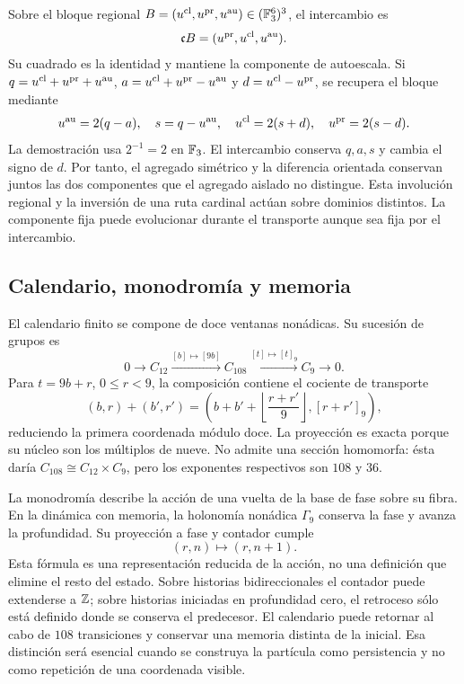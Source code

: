 Sobre el bloque regional
\(B=(u^{\rm cl},u^{\rm pr},u^{\rm au})\in(\mathbb F_3^6)^3\),
el intercambio es
\[
 \mathfrak cB=(u^{\rm pr},u^{\rm cl},u^{\rm au}).
\]
Su cuadrado es la identidad y mantiene la componente de autoescala.
Si \(q=u^{\rm cl}+u^{\rm pr}+u^{\rm au}\),
\(a=u^{\rm cl}+u^{\rm pr}-u^{\rm au}\) y
\(d=u^{\rm cl}-u^{\rm pr}\), se recupera el bloque mediante
\[
 u^{\rm au}=2(q-a),\quad s=q-u^{\rm au},\quad
 u^{\rm cl}=2(s+d),\quad u^{\rm pr}=2(s-d).
\]
La demostración usa \(2^{-1}=2\) en \(\mathbb F_3\). El intercambio
conserva \(q,a,s\) y cambia el signo de \(d\). Por tanto,
el agregado simétrico y la diferencia orientada conservan juntos
las dos componentes que el agregado aislado no distingue.
Esta involución regional y la inversión de una ruta cardinal
actúan sobre dominios distintos. La componente fija puede
evolucionar durante el transporte aunque sea fija por el intercambio.

\subsection{Calendario, monodromía y memoria}

El calendario finito se compone de doce ventanas nonádicas. Su
sucesión de grupos es
\begin{equation}
 0\longrightarrow C_{12}\xrightarrow{[b]\mapsto[9b]}C_{108}
 \xrightarrow{[t]\mapsto[t]_9}C_9\longrightarrow0.
 \label{eq:extension108}
\end{equation}
Para \(t=9b+r\), \(0\le r<9\), la composición contiene
el cociente de transporte
\[
 (b,r)+(b',r')=
 \left(b+b'+\left\lfloor\frac{r+r'}9\right\rfloor,
       [r+r']_9\right),
\]
reduciendo la primera coordenada módulo doce. La proyección es
exacta porque su núcleo son los múltiplos de nueve. No admite una
sección homomorfa: ésta daría \(C_{108}\cong C_{12}\times C_9\),
pero los exponentes respectivos son \(108\) y \(36\).

La monodromía describe la acción de una vuelta de la base de fase
sobre su fibra. En la dinámica con memoria, la holonomía nonádica
\(\Gamma_9\) conserva la fase y avanza la profundidad. Su
proyección a fase y contador cumple
\[
 (r,n)\longmapsto(r,n+1).
\]
Esta fórmula es una representación reducida de la acción, no una
definición que elimine el resto del estado. Sobre historias
bidireccionales el contador puede extenderse a \(\mathbb Z\); sobre
historias iniciadas en profundidad cero, el retroceso sólo está
definido donde se conserva el predecesor. El calendario puede
retornar al cabo de \(108\) transiciones y conservar una memoria
distinta de la inicial. Esa distinción será esencial cuando se
construya la partícula como persistencia y no como repetición de
una coordenada visible.

